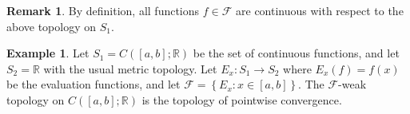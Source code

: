 \documentclass[11pt]{article}
\theoremstyle{definition}
\newtheorem{example}[thm]{Example}
\newtheorem{remark}[thm]{Remark}
\newcommand{\set}[1]{\left\{ #1 \right\}}
\newcommand{\RR}{\mathbb{R}}
\newcommand{\m}[1]{\mathcal{#1}}
\begin{document}
\begin{remark}
By definition, all functions $f\in\m{F}$ are continuous with respect to the above topology
on $S_1$.
\end{remark}

\begin{example}
Let $S_1=C([a,b];\RR)$ be the set of continuous functions, and let $S_2=\RR$ with the usual
metric topology. Let $E_x:S_1\to S_2$ where $E_x(f)=f(x)$ be the evaluation functions, and
let $\m{F}=\set{E_x:x\in[a,b]}$. The $\m{F}$-weak topology on $C([a,b];\RR)$ is the
topology of pointwise convergence.
\end{example}



\end{document}
